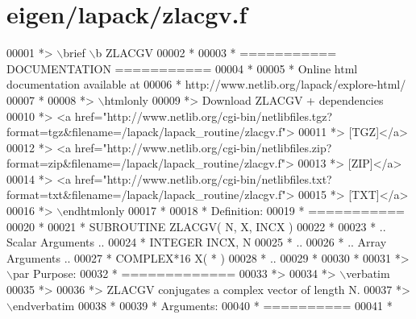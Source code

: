 \hypertarget{eigen_2lapack_2zlacgv_8f_source}{}\section{eigen/lapack/zlacgv.f}
\label{eigen_2lapack_2zlacgv_8f_source}

\begin{DoxyCode}
00001 \textcolor{comment}{*> \(\backslash\)brief \(\backslash\)b ZLACGV}
00002 \textcolor{comment}{*}
00003 \textcolor{comment}{*  =========== DOCUMENTATION ===========}
00004 \textcolor{comment}{*}
00005 \textcolor{comment}{* Online html documentation available at }
00006 \textcolor{comment}{*            http://www.netlib.org/lapack/explore-html/ }
00007 \textcolor{comment}{*}
00008 \textcolor{comment}{*> \(\backslash\)htmlonly}
00009 \textcolor{comment}{*> Download ZLACGV + dependencies }
00010 \textcolor{comment}{*> <a
       href="http://www.netlib.org/cgi-bin/netlibfiles.tgz?format=tgz&filename=/lapack/lapack\_routine/zlacgv.f"> }
00011 \textcolor{comment}{*> [TGZ]</a> }
00012 \textcolor{comment}{*> <a
       href="http://www.netlib.org/cgi-bin/netlibfiles.zip?format=zip&filename=/lapack/lapack\_routine/zlacgv.f"> }
00013 \textcolor{comment}{*> [ZIP]</a> }
00014 \textcolor{comment}{*> <a
       href="http://www.netlib.org/cgi-bin/netlibfiles.txt?format=txt&filename=/lapack/lapack\_routine/zlacgv.f"> }
00015 \textcolor{comment}{*> [TXT]</a>}
00016 \textcolor{comment}{*> \(\backslash\)endhtmlonly }
00017 \textcolor{comment}{*}
00018 \textcolor{comment}{*  Definition:}
00019 \textcolor{comment}{*  ===========}
00020 \textcolor{comment}{*}
00021 \textcolor{comment}{*       SUBROUTINE ZLACGV( N, X, INCX )}
00022 \textcolor{comment}{* }
00023 \textcolor{comment}{*       .. Scalar Arguments ..}
00024 \textcolor{comment}{*       INTEGER            INCX, N}
00025 \textcolor{comment}{*       ..}
00026 \textcolor{comment}{*       .. Array Arguments ..}
00027 \textcolor{comment}{*       COMPLEX*16         X( * )}
00028 \textcolor{comment}{*       ..}
00029 \textcolor{comment}{*  }
00030 \textcolor{comment}{*}
00031 \textcolor{comment}{*> \(\backslash\)par Purpose:}
00032 \textcolor{comment}{*  =============}
00033 \textcolor{comment}{*>}
00034 \textcolor{comment}{*> \(\backslash\)verbatim}
00035 \textcolor{comment}{*>}
00036 \textcolor{comment}{*> ZLACGV conjugates a complex vector of length N.}
00037 \textcolor{comment}{*> \(\backslash\)endverbatim}
00038 \textcolor{comment}{*}
00039 \textcolor{comment}{*  Arguments:}
00040 \textcolor{comment}{*  ==========}
00041 \textcolor{comment}{*}

\end{DoxyCode}
